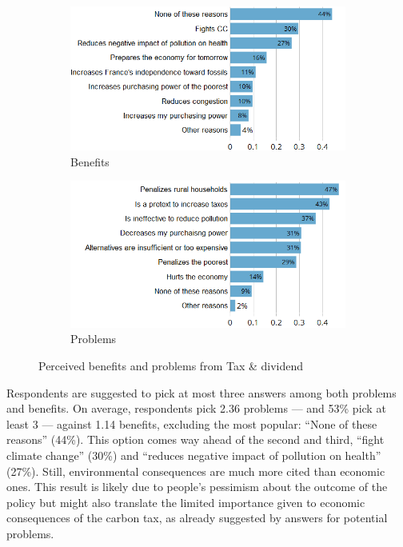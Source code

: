 \documentclass[english,5p,authoryear]{elsarticle}
\begin{document}
\begin{figure}[t]
\centering
\begin{subfigure}[b]{\columnwidth}
   \caption{Benefits}
   \includegraphics[width=\columnwidth]{Images/CC_benefits_synchro.png}
\end{subfigure}

\begin{subfigure}[b]{\columnwidth}
\vspace{0.3cm}
   \caption{Problems}
   \includegraphics[width=\columnwidth]{Images/CC_problems_synchro.png}
\end{subfigure}
\caption{Perceived benefits and problems from Tax \& dividend}
   \label{fig:benefits_problems}
\end{figure}

Respondents are suggested to pick at most three answers among both problems and benefits. On average, respondents pick 2.36 problems --- and 53\% pick at least 3 --- against 1.14 benefits, excluding the most popular: ``None of these reasons'' (44\%). This option comes way ahead of the second and third, ``fight climate change'' (30\%) and ``reduces negative impact of pollution on health'' (27\%). Still, environmental consequences are much more cited than economic ones. This result is likely due to people's pessimism about the outcome of the policy but might also translate the limited importance given to economic consequences of the carbon tax, as already suggested by answers for potential problems. %
\end{document}
